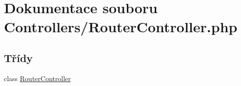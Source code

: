 \hypertarget{_router_controller_8php}{\section{Dokumentace souboru Controllers/\-Router\-Controller.php}
\label{_router_controller_8php}
}
\subsection*{Třídy}
\begin{DoxyCompactItemize}
\item 
class \hyperlink{class_router_controller}{Router\-Controller}
\end{DoxyCompactItemize}
